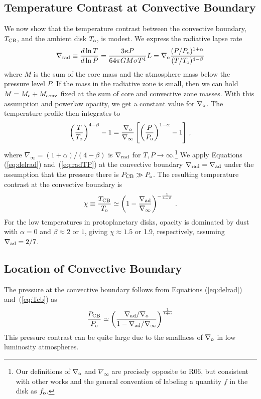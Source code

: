\documentclass[12pt, preprint,numberedappendix]{emulateapj}
\newcommand{\Eqs}[2]{Equations (\ref{#1}) and~(\ref{#2})}
\newcommand{\delad}{\nabla_{\rm ad}}
\newcommand{\delrad}{\nabla_{\rm rad}}
\newcommand{\co}{_{\rm c}}
\newcommand{\di}{_{\rm o}}
\newcommand{\cb}{_{\rm CB}}
\begin{document}
\subsection{Temperature Contrast at Convective Boundary}
We now show that the temperature contrast between the convective boundary, $T\cb$, and the ambient disk $T\di$, is modest.  We express the radiative lapse rate
\begin{equation}\label{eq:delrad}
\delrad \equiv {d \ln T \over d \ln P} = {3 \kappa P \over 64 \pi  G M \sigma T^4} L = \nabla\di {(P/P\di)^{1+\alpha} \over (T/T\di)^{4-\beta}}
\end{equation}
where $M$ is the sum of the core mass and the atmosphere mass below the pressure level $P$.  If the mass in the radiative zone is small, then we can hold $M = M\co + M_{\rm conv}$ fixed at the sum of core and convective zone masses.  With this assumption and powerlaw opacity, we get a constant value for $\nabla\di$.  The temperature profile then integrates to
\begin{equation}\label{eq:radTP}
\left(T \over T\di\right)^{4-\beta} - 1 = {\nabla\di \over \nabla_\infty} \left[\left({P \over P\di}\right)^{1-\alpha} - 1 \right] \, ,
\end{equation} 
where $\nabla_\infty = (1+\alpha)/(4-\beta)$ is $\delrad$ for $T ,P \rightarrow \infty$.\footnote{Our definitions of $\nabla\di$ and $\nabla_\infty$ are precisely opposite to R06, but consistent with other works and the general convention of labeling a quantity $f$ in the disk as $f\di$.}
We  apply \Eqs{eq:delrad}{eq:radTP} at the convective boundary $\delrad = \delad$ under the assumption that the pressure there is $P\cb \gg P\di$. The resulting temperature contrast at the convective boundary is
\begin{equation}\label{eq:Tcb}
\chi \equiv {T\cb\over T\di} \simeq \left(1 - {\nabla_{\rm ad} \over \nabla_\infty}\right)^{-\frac{1}{4-\beta}} \, .
\end{equation} 
For  the low temperatures in protoplanetary disks, opacity is dominated by dust with $\alpha = 0$ and $\beta \approx 2$ or $1$, giving $\chi \approx 1.5$ or 1.9, respectively, assuming  $\delad = 2/7$.

\subsection{Location of Convective Boundary}
The pressure at the convective boundary  follows from \Eqs{eq:delrad}{eq:Tcb} as
\begin{equation}
{P\cb\over P\di} \simeq \left({\delad/\nabla\di \over 1 - \delad/\nabla_\infty}\right)^{1 \over 1 + \alpha}
\end{equation} 
This pressure contrast can be quite large due to the smallness of $\nabla\di$ in low luminosity atmospheres.
 
\end{document}
